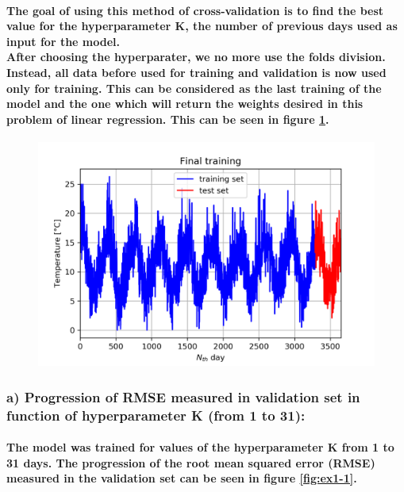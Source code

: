 \documentclass[a4paper]{article}
\begin{document}
\paragraph{The goal of using this method of cross-validation is to find the best value for the hyperparameter K, the number of previous days used as input for the model.\\After choosing the hyperparater, we no more use the folds division. Instead, all data before used for training and validation is now used only for training. This can be considered as the last training of the model and the one which will return the weights desired in this problem of linear regression. This can be seen in figure \ref{fig:pre-ex1-10}.}

\begin{figure}[ht]
    \centering
    \includegraphics[width=12cm]{figure_10_final_training}
    \caption{}
    \label{fig:pre-ex1-10}
\end{figure}

\subsubsection{a) Progression of RMSE measured in validation set in function of hyperparameter K (from 1 to 31):}

\paragraph{The model was trained for values of the hyperparameter K from 1 to 31 days. The progression of the root mean squared error (RMSE) measured in the validation set can be seen in figure \ref{fig:ex1-1}.}
\end{document}
